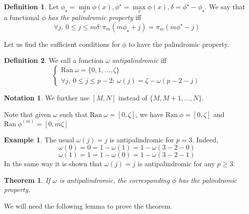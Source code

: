 \documentclass[a4paper]{article}
\theoremstyle{plain}
\newtheorem{theorem}{Theorem}[section]
\theoremstyle{definition}
\newtheorem{definition}{Definition}
\newtheorem*{notation}{Notation}
\newtheorem*{example}{Example}
\begin{document}
\begin{definition}
Let $\phi_\star = \min\limits_x \phi(x), \phi^\star = \max\limits_x \phi(x), \delta=\phi^\star - \phi_\star$. We say that a functional $\phi$  \textit{has the palindromic property} iff 
$$
\forall j,\ 0 \le j \le m\delta:   \pi_m(m\phi_\star + j)=\pi_m(m\phi^\star-j)
$$
\end{definition}
    
    Let us find the sufficient conditions for $\phi$ to have the palindromic property.
    
\begin{definition}
We call a function $\omega$  \textit{antipalindromic} iff
\[\begin{cases}
	\mathrm{Ran }\ \omega = \{0,1, \ldots, \zeta\} \\
	\forall j,\ 0 \le j \le p-2: \  \omega(j) = \zeta - \omega(p-2-j)
\end{cases}\]
\end{definition}

\begin{notation}
We further use $[M, N]$ instead of $\{M,M+1, \ldots, N\}$.
\end{notation}

Note that given $\omega$ such that $\mathrm{Ran}\ \omega = [0,\zeta]$, we have $\mathrm{Ran}\ \phi = [0,\zeta]$ and $\mathrm{Ran}\ \phi^{(m)} = [0,m\zeta]$

\begin{example}
The usual $\omega(j)=j$ is antipalindromic for $p = 3$. Indeed,
$$
\omega(0) = 0 = 1 - \omega(1) = 1 - \omega(3 - 2 - 0)
$$
$$
\omega(1) = 1 = 1 - \omega(0) = 1 - \omega(3 - 2 - 1)
$$
In the same way it is shown that $\omega(j)=j$ is antipalindromic for any $p \ge 3$.
\end{example}

\begin{theorem}
If $\omega$ is antipalindromic, the corresponding $\phi$ has the palindromic property.
\end{theorem}

We will need the following lemma to prove the theorem.
\end{document}
